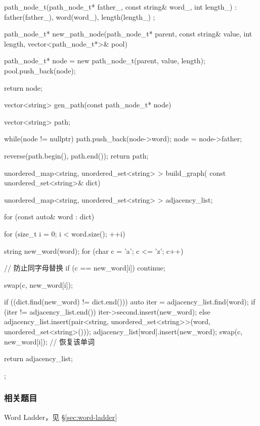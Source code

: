 \begin{Code}
{{        path_node_t(path_node_t* father_, const string& word_, int length_) :
            father(father_), word(word_), length(length_) {}
    };

    path_node_t* new_path_node(path_node_t* parent, const string& value,
            int length, vector<path_node_t*>& pool) {
        path_node_t* node = new path_node_t(parent, value, length);
        pool.push_back(node);

        return node;
    }
    vector<string> gen_path(const path_node_t* node) {
        vector<string> path;

        while(node != nullptr) {
            path.push_back(node->word);
            node = node->father;
        }

        reverse(path.begin(), path.end());
        return path;
    }

    unordered_map<string, unordered_set<string> > build_graph(
            const unordered_set<string>& dict) {
        unordered_map<string, unordered_set<string> > adjacency_list;

        for (const auto& word : dict) {
            for (size_t i = 0; i < word.size(); ++i) {
                string new_word(word);
                for (char c = 'a'; c <= 'z'; c++) {
                    // 防止同字母替换
                    if (c == new_word[i]) continue;

                    swap(c, new_word[i]);

                    if ((dict.find(new_word) != dict.end())) {
                        auto iter = adjacency_list.find(word);
                        if (iter != adjacency_list.end()) {
                            iter->second.insert(new_word);
                        }
                        else {
                            adjacency_list.insert(pair<string,
                                unordered_set<string>>(word, unordered_set<string>()));
                            adjacency_list[word].insert(new_word);
                        }
                    }
                    swap(c, new_word[i]); // 恢复该单词
                }
            }
        }
        return adjacency_list;
    }
};
\end{Code}


\subsubsection{相关题目}

\begindot
\item Word Ladder，见 \S \ref{sec:word-ladder}
\myenddot


